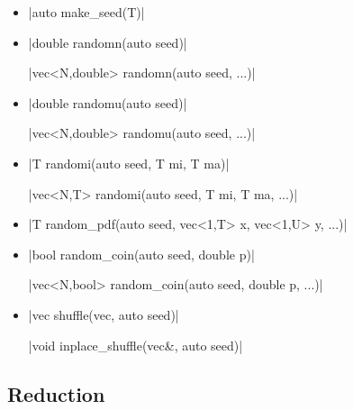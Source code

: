 \documentclass[12pt]{report}
\begin{document}
\begin{itemize}
\item \cppinline|auto make_seed(T)| 

\item \cppinline|double randomn(auto seed)| 

\cppinline|vec<N,double> randomn(auto seed, ...)|

\item \cppinline|double randomu(auto seed)| 

\cppinline|vec<N,double> randomu(auto seed, ...)|

\item \cppinline|T randomi(auto seed, T mi, T ma)| 

\cppinline|vec<N,T> randomi(auto seed, T mi, T ma, ...)|

\item \cppinline|T random_pdf(auto seed, vec<1,T> x, vec<1,U> y, ...)| 

\item \cppinline|bool random_coin(auto seed, double p)| 

\cppinline|vec<N,bool> random_coin(auto seed, double p, ...)|

\item \cppinline|vec shuffle(vec, auto seed)| 

\cppinline|void inplace_shuffle(vec&, auto seed)| 
\end{itemize}

\subsection{Reduction}
\end{document}
